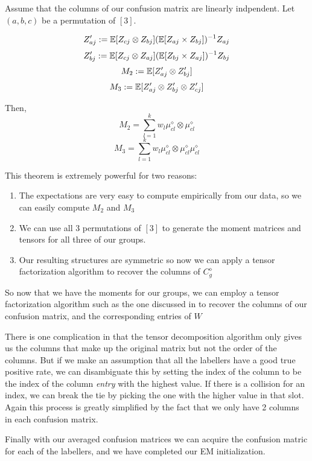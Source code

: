 \begin{theorem}
Assume that the columns of our confusion matrix are linearly indpendent. Let $(a,b,c)$ be a permutation of $[3]$.

$$Z'_{aj} := \mathbb{E}[Z_{cj} \otimes Z_{bj}](\mathbb{E}[Z_{aj} \times Z_{bj}])^{-1}Z_{aj}$$
$$Z'_{bj} := \mathbb{E}[Z_{cj} \otimes Z_{aj}](\mathbb{E}[Z_{bj} \times Z_{aj}])^{-1}Z_{bj}$$
$$M_{2} := \mathbb{E}[Z'_{aj} \otimes  Z'_{bj}]$$
$$M_{3} := \mathbb{E}[Z'_{aj} \otimes Z'_{bj} \otimes Z'_{cj}]$$

Then,
$$M_{2} = \displaystyle\sum\limits_{l=1}^{k} w_{l}\mu^{\diamond}_{cl} \otimes \mu^{\diamond}_{cl} $$
$$M_{3} = \displaystyle\sum\limits_{l=1}^{k} w_{l}\mu^{\diamond}_{cl} \otimes \mu^{\diamond}_{cl} \mu^{\diamond}_{cl} $$
\end{theorem}

This theorem is extremely powerful for two reasons:

\begin{enumerate} 
\item The expectations are very easy to compute empirically from our data, so we can easily compute $M_{2}$ and $M_{3}$
\item We can use all 3 permutations of $[3]$ to generate the moment matrices and tensors for all three of our groups.
\item Our resulting structures are symmetric so now we can apply a tensor factorization algorithm to recover the columns of $C^{\diamond}_{g}$
\end{enumerate}

So now that we have the moments for our groups, we can employ a tensor factorization algorithm such as the one discussed in \cite{anandkumar2014tensor} to recover the columns of our confusion matrix, and the corresponding entries of $W$

There is one complication in that the tensor decomposition algorithm only gives us the columns that make up the original matrix but not the order of the columns. But if we make an assumption that all the labellers have a good true positive rate, we can disambiguate this by setting the index of the column to be the index of the column \textit{entry} with the highest value. If there is a collision for an index, we can break the tie by picking the one with the higher value in that slot. Again this process is greatly simplified by the fact that we only have 2 columns in each confusion matrix. 

Finally with our averaged confusion matrices we can acquire the confusion matric for each of the labellers, and we have completed our EM initialization.

